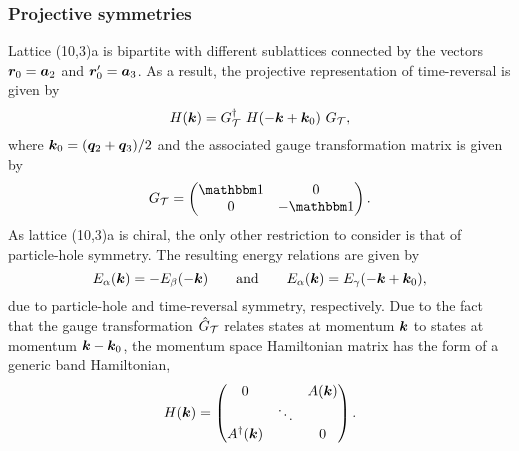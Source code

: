 \subsubsection{Projective symmetries}
%
%
Lattice (10,3)a is bipartite with different sublattices connected by the vectors $\bm{r}_0 = \bm{a}_2$ and $\bm{r}'_0 = \bm{a}_3$.
As a result, the projective representation of time-reversal is given by
%
\begin{equation}
	H(\bm{k}) = G^{\dagger}_{\mathcal{T}}~H(-\bm{k} + \bm{k}_0)~G_{\mathcal{T}},
\end{equation}
%
where $\bm{k}_0 = (\bm{q}_2 + \bm{q}_3)/2$ and the associated gauge transformation matrix is given by
%
\begin{equation}
	G_{\mathcal{T}} =
	\begin{pmatrix}
		\id	& 0    \\
		0	& -\id
	\end{pmatrix}.
\end{equation}
%
As lattice (10,3)a is chiral, the only other restriction to consider is that of particle-hole symmetry.
The resulting energy relations are given by
%
\begin{equation}
	E_{\alpha}(\bm{k}) = -E_{\beta}(-\bm{k}) \qquad {\rm and } \qquad E_{\alpha}(\bm{k}) = E_{\gamma}(-\bm{k} + \bm{k}_0),
\end{equation}
%
due to particle-hole and time-reversal symmetry, respectively.
Due to the fact that the gauge transformation $\hat{G}_{\mathcal{T}}$ relates states at momentum $\bm{k}$ to states at momentum $\bm{k} - \bm{k}_0$, the momentum space Hamiltonian matrix has the form of a generic band Hamiltonian,
%
\begin{equation}
	H(\bm{k}) =
		\begin{pmatrix}
			0			&		 & A(\bm{k}) \\
						& \ddots &		  \\
			A^{\dagger}(\bm{k})	&		 & 0
		\end{pmatrix}.
\end{equation}
%


%
%
